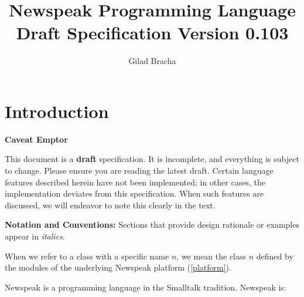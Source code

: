 \documentclass{article}
\title{Newspeak Programming Language Draft Specification Version 0.103}
\author{Gilad Bracha}
\begin{document}
\maketitle
\tableofcontents

\section{Introduction}

{\em

 {\bf Caveat Emptor}
 
This document is a {\bf  draft} specification. It is incomplete, and everything is subject to change. Please ensure you are reading the latest draft. Certain language features described herein have not been implemented; in other cases, the implementation deviates from this specification. When such features are discussed, we will endeavor to note this clearly in the text.

}


{\bf Notation and Conventions:} Sections that provide design rationale or examples appear in {\em italics}. 

When we refer to a class with a specific name $n$, we mean the class $n$ defined by the modules of the underlying Newspeak platform (\ref{platform}).

Newspeak is a programming language in the Smalltalk \cite{GoldbergRobson83} tradition.  
Newspeak is:
\end{document}
